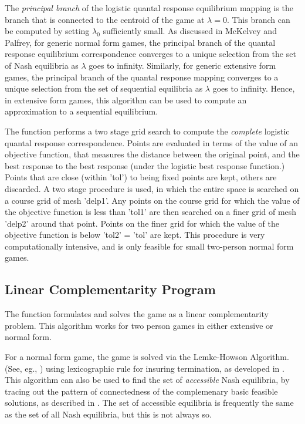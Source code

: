 The {\em principal branch} of the logistic quantal response
equilibrium mapping is the branch that is connected to the centroid of
the game at $\lambda = 0$.  This branch can be computed by setting
$\lambda_0$ sufficiently small.  As discussed in McKelvey and Palfrey,
for generic normal form games, the principal branch of the quantal
response equilibrium correspondence converges to a unique selection
from the set of Nash equilibria as $\lambda$ goes to infinity.
Similarly, for generic extensive form games, the principal branch of
the quantal response mapping converges to a unique selection from the
set of sequential equilibria as $\lambda$ goes to infinity.  Hence, in
extensive form games, this algorithm can be used to compute an
approximation to a sequential equilibrium.

The  function performs a two stage grid search to
compute the {\em complete} logistic quantal response correspondence.
Points are evaluated in terms of the value of an objective function,
that measures the distance between the original point, and the best
response to the best response (under the logistic best response
function.)  Points that are close (within 'tol') to being fixed points
are kept, others are discarded.  A two stage procedure is used, in
which the entire space is searched on a course grid of mesh 'delp1'.
Any points on the course grid for which the value of the objective
function is less than 'tol1' are then searched on a finer grid of mesh
'delp2' around that point.  Points on the finer grid for which the
value of the objective function is below 'tol2' = 'tol' are kept.
This procedure is very computationally intensive, and is only feasible
for small two-person normal form games.

\subsection{Linear Complementarity Program}

The  function formulates and solves the game as a linear
complementarity problem.  This algorithm works for two person
games in either extensive or normal form.  
 
For a normal form game, the game is solved via the Lemke-Howson
Algorithm.  (See, eg.,
\cite{LemHow:64}) using lexicographic rule for insuring
termination, as developed in \cite{Eav:71}.  This algorithm can also
be used to find the set of {\em accessible} Nash equilibria, by
tracing out the pattern of connectedness of the complemenary basic
feasible solutions, as described in \cite{Sha:74}.  The set of
accessible equilibria is frequently the same as the set of all Nash
equilibria, but this is not always so.

